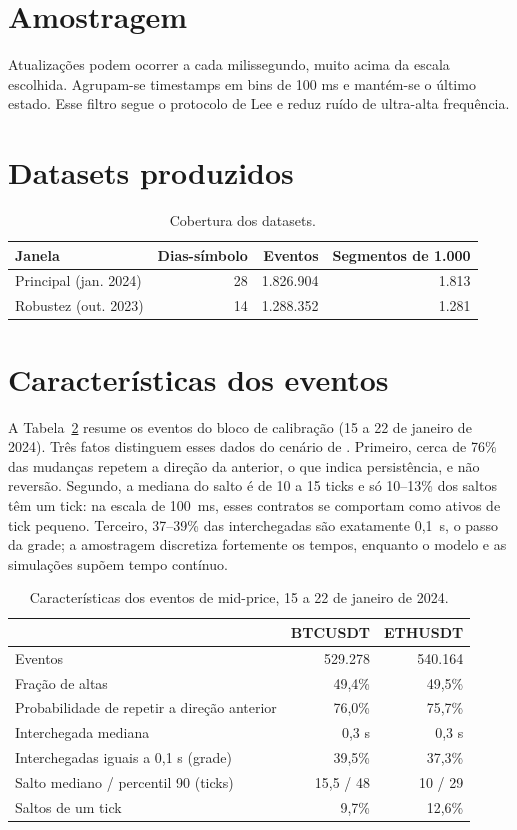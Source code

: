 \documentclass[12pt,a4paper,openany]{report}
\begin{document}
\section{Amostragem}

Atualizações podem ocorrer a cada milissegundo, muito acima da escala escolhida.
Agrupam-se timestamps em bins de 100 ms e mantém-se o último estado. Esse filtro segue
o protocolo de Lee e reduz ruído de ultra-alta frequência.

\section{Datasets produzidos}

\begin{table}[htbp]
\centering
\caption{Cobertura dos datasets.}
\label{tab:cobertura}
\begin{tabular}{lrrr}
\toprule
Janela & Dias-símbolo & Eventos & Segmentos de 1.000\\
\midrule
Principal (jan. 2024) & 28 & 1.826.904 & 1.813\\
Robustez (out. 2023) & 14 & 1.288.352 & 1.281\\
\bottomrule
\end{tabular}
\end{table}

\section{Características dos eventos}
\label{sec:caracteristicas}

A Tabela~\ref{tab:caracteristicas} resume os eventos do bloco de calibração (15 a
22 de janeiro de 2024). Três fatos distinguem esses dados do cenário de
\citet{lee2023}. Primeiro, cerca de 76\% das mudanças repetem a direção da anterior,
o que indica persistência, e não reversão. Segundo, a mediana do salto é de 10 a 15
ticks e só 10--13\% dos saltos têm um tick: na escala de 100~ms, esses contratos se
comportam como ativos de tick pequeno. Terceiro, 37--39\% das interchegadas são
exatamente 0,1~s, o passo da grade; a amostragem discretiza fortemente os tempos,
enquanto o modelo e as simulações supõem tempo contínuo.

\begin{table}[htbp]
\centering
\caption{Características dos eventos de mid-price, 15 a 22 de janeiro de 2024.}
\label{tab:caracteristicas}
\small
\begin{tabular}{lrr}
\toprule
 & BTCUSDT & ETHUSDT\\
\midrule
Eventos & 529.278 & 540.164\\
Fração de altas & 49,4\% & 49,5\%\\
Probabilidade de repetir a direção anterior & 76,0\% & 75,7\%\\
Interchegada mediana & 0,3 s & 0,3 s\\
Interchegadas iguais a 0,1 s (grade) & 39,5\% & 37,3\%\\
Salto mediano / percentil 90 (ticks) & 15,5 / 48 & 10 / 29\\
Saltos de um tick & 9,7\% & 12,6\%\\
\bottomrule
\end{tabular}
\end{table}
\end{document}
